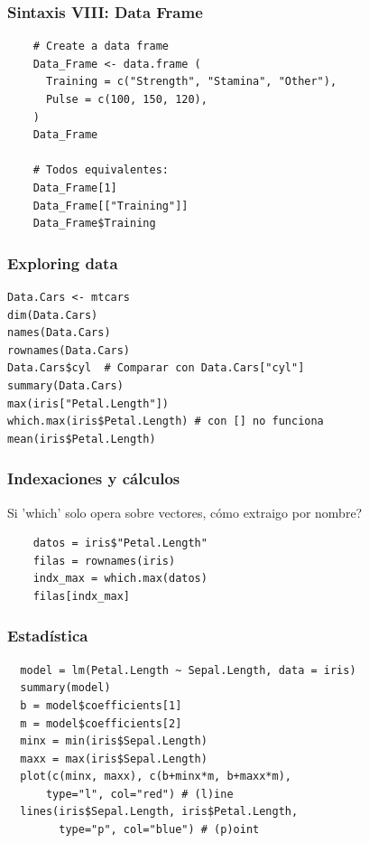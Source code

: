 \documentclass[14pt,aspectratio=169,xcolor=dvipsnames]{beamer}
\begin{document}
\begin{frame}[fragile]\frametitle{Sintaxis VIII: Data Frame}
    \begin{verbatim}
    # Create a data frame
    Data_Frame <- data.frame (
      Training = c("Strength", "Stamina", "Other"),
      Pulse = c(100, 150, 120),
    )
    Data_Frame 

    # Todos equivalentes: 
    Data_Frame[1]
    Data_Frame[["Training"]]
    Data_Frame$Training 
    \end{verbatim}
\end{frame}
\begin{frame}[fragile]\frametitle{Exploring data}
    \begin{verbatim}
Data.Cars <- mtcars 
dim(Data.Cars)
names(Data.Cars) 
rownames(Data.Cars)
Data.Cars$cyl  # Comparar con Data.Cars["cyl"]
summary(Data.Cars)
max(iris["Petal.Length"]) 
which.max(iris$Petal.Length) # con [] no funciona
mean(iris$Petal.Length)
    \end{verbatim}
\end{frame}
\begin{frame}[fragile]\frametitle{Indexaciones y cálculos}
Si 'which' solo opera sobre vectores, cómo extraigo por nombre? \pause

    \begin{verbatim}  
    datos = iris$"Petal.Length"
    filas = rownames(iris)
    indx_max = which.max(datos)
    filas[indx_max]
    \end{verbatim}
\end{frame}
\begin{frame}[fragile]\frametitle{Estadística}
    \begin{small}
\begin{verbatim}
  model = lm(Petal.Length ~ Sepal.Length, data = iris)
  summary(model)
  b = model$coefficients[1]
  m = model$coefficients[2]
  minx = min(iris$Sepal.Length)
  maxx = max(iris$Sepal.Length)
  plot(c(minx, maxx), c(b+minx*m, b+maxx*m), 
      type="l", col="red") # (l)ine
  lines(iris$Sepal.Length, iris$Petal.Length, 
        type="p", col="blue") # (p)oint
\end{verbatim}
    \end{small}
\end{frame}
\end{document}
